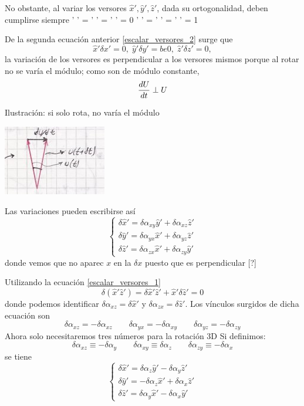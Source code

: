 \documentclass[10pt,oneside]{CBFT_book}
\begin{document}
No obstante, al variar los versores $\hat{x}',\hat{y}',\hat{z}'$, dada su ortogonalidad,
deben cumplirse siempre
\be
	' ' = ' ' = ' ' = 0
	\label{escalar_versores_1}
\ee
\be
	' ' = ' ' = ' ' = 1
	\label{escalar_versores_2}
\ee

De la segunda ecuación anterior \eqref{escalar_versores_2} surge que 
\[
	\hat{x}' \delta {x}' = 0, \; \hat{y}' \delta {y}' = be0, \;  \hat{z}' \delta {z}' = 0,
\]
la variación de los versores es perpendicular a los versores mismos porque al rotar no se varía
el módulo; como son de módulo constante,
\[
	\frac{d^{\hspace{-0.05em}} {U}}{d {t}^{\hspace{-0.05em}}} \perp U
\]

Ilustración: si solo rota, no varía el módulo

\includegraphics[scale=0.5]{images/fig_mc_rotantes4.jpg}

Las variaciones pueden escribirse así
\[
	\begin{cases}
	\delta \hat{x}' = \delta \alpha_{xy} \hat{y}' + \delta \alpha_{xz} \hat{z}' \\
	\delta \hat{y}' = \delta \alpha_{yx} \hat{x}' + \delta \alpha_{yz} \hat{z}' \\
	\delta \hat{z}' = \delta \alpha_{zx} \hat{x}' + \delta \alpha_{zy} \hat{y}'
	\end{cases}
\]
donde vemos que no aparec $x$ en la $\delta x$ puesto que es perpendicular [?]

Utilizando la ecuación \eqref{escalar_versores_1}
\[
	\delta( \hat{x}' \hat{z}') = \delta \hat{x}' \hat{z}' + \hat{x}' \delta \hat{z}' = 0
\]
donde podemos identificar $\delta\alpha_{xz}=\delta \hat{x}'$ y $\delta\alpha_{zx}=\delta \hat{z}'$.
Los vínculos surgidos de dicha ecuación son 
\[
	\delta\alpha_{xz} = -\delta\alpha_{xz} \qquad 
	\delta\alpha_{yx} = -\delta\alpha_{xy} \qquad 
	\delta\alpha_{yz} = -\delta\alpha_{zy} 
\]
Ahora solo necesitaremos tres números para la rotación 3D
Si definimos:
\[
	\delta\alpha_{xz} \equiv -\delta\alpha_{y} \qquad 
	\delta\alpha_{xy} \equiv \delta\alpha_{z} \qquad 
	\delta\alpha_{zy} \equiv -\delta\alpha_{x} 
\]
se tiene 
\[
	\begin{cases}
	\delta \hat{x}' = \delta \alpha_{z} \hat{y}' - \delta \alpha_{y} \hat{z}' \\
	\delta \hat{y}' = -\delta \alpha_{z} \hat{x}' + \delta \alpha_{x} \hat{z}' \\
	\delta \hat{z}' = \delta \alpha_{y} \hat{x}' - \delta \alpha_{x} \hat{y}'
	\end{cases}
\]
\end{document}

